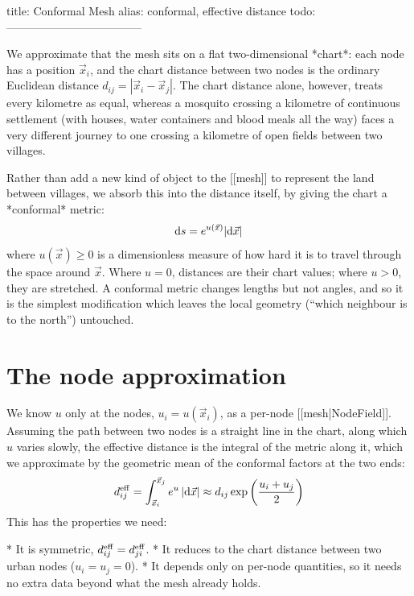 title: Conformal Mesh
alias: conformal, effective distance
todo:
------------------------------------

We approximate that the mesh sits on a flat two-dimensional *chart*: each node has a position $\vec{x}_i$, and the chart distance between two nodes is the ordinary Euclidean distance $d_{ij} = |\vec{x}_i - \vec{x}_j|$. The chart distance alone, however, treats every kilometre as equal, whereas a mosquito crossing a kilometre of continuous settlement (with houses, water containers and blood meals all the way) faces a very different journey to one crossing a kilometre of open fields between two villages.

Rather than add a new kind of object to the [[mesh]] to represent the land between villages, we absorb this into the distance itself, by giving the chart a *conformal* metric:
\begin{equation}
	{\rm d}s = e^{u(\vec{x})} |{\rm d}\vec{x}|
\end{equation}
where $u(\vec{x}) \geq 0$ is a dimensionless measure of how hard it is to travel through the space around $\vec{x}$. Where $u = 0$, distances are their chart values; where $u > 0$, they are stretched. A conformal metric changes lengths but not angles, and so it is the simplest modification which leaves the local geometry (``which neighbour is to the north'') untouched.

\section{The node approximation}

	We know $u$ only at the nodes, $u_i = u(\vec{x}_i)$, as a per-node [[mesh|NodeField]]. Assuming the path between two nodes is a straight line in the chart, along which $u$ varies slowly, the effective distance is the integral of the metric along it, which we approximate by the geometric mean of the conformal factors at the two ends:
	\begin{equation}
		d^{\rm eff}_{ij} = \int_{\vec{x}_i}^{\vec{x}_j} e^{u} \, |{\rm d}\vec{x}| \approx d_{ij} \exp\left(\frac{u_i + u_j}{2}\right)
	\end{equation}
	This has the properties we need:

	* It is symmetric, $d^{\rm eff}_{ij} = d^{\rm eff}_{ji}$.
	* It reduces to the chart distance between two urban nodes ($u_i = u_j = 0$).
	* It depends only on per-node quantities, so it needs no extra data beyond what the mesh already holds.

